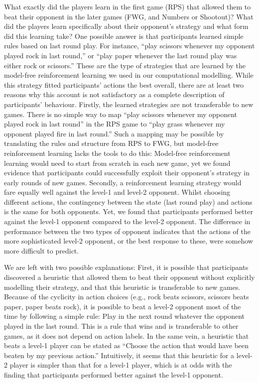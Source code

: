 \documentclass[smallextended]{svjour3}       %
\begin{document}
What exactly did the players learn in the first game (RPS) that allowed
them to beat their opponent in the later games (FWG, and Numbers or
Shootout)? What did the players learn specifically about their
opponent's strategy and what form did this learning take? One possible
answer is that participants learned simple rules based on last round
play. For instance, ``play scissors whenever my opponent played rock in
last round,'' or ``play paper whenever the last round play was either
rock or scissors.'' These are the type of strategies that are learned by
the model-free reinforcement learning we used in our computational
modelling. While this strategy fitted participants' actions the best
overall, there are at least two reasons why this account is not
satisfactory as a complete description of participants' behaviour.
Firstly, the learned strategies are not transferable to new games. There
is no simple way to map ``play scissors whenever my opponent played rock
in last round'' in the RPS game to ``play grass whenever my opponent
played fire in last round.'' Such a mapping may be possible by
translating the rules and structure from RPS to FWG, but model-free
reinforcement learning lacks the tools to do this: Model-free
reinforcement learning would need to start from scratch in each new
game, yet we found evidence that participants could successfully exploit
their opponent's strategy in early rounds of new games. Secondly, a
reinforcement learning strategy would fare equally well against the
level-1 and level-2 opponent. Whilst choosing different actions, the
contingency between the state (last round play) and actions is the same
for both opponents. Yet, we found that participants performed better
against the level-1 opponent compared to the level-2 opponent. The
difference in performance between the two types of opponent indicates
that the actions of the more sophisticated level-2 opponent, or the best
response to these, were somehow more difficult to predict.

We are left with two possible explanations: First, it is possible that
participants discovered a heuristic that allowed them to beat their
opponent without explicitly modelling their strategy, and that this
heuristic is transferable to new games. Because of the cyclicity in
action choices (e.g., rock beats scissors, scissors beats paper, paper
beats rock), it is possible to beat a level-2 opponent most of the time
by following a simple rule: Play in the next round whatever the opponent
played in the last round. This is a rule that wins and is transferable
to other games, as it does not depend on action labels. In the same
vein, a heuristic that beats a level-1 player can be stated as ``Choose
the action that would have been beaten by my previous action.''
Intuitively, it seems that this heuristic for a level-2 player is
simpler than that for a level-1 player, which is at odds with the
finding that participants performed better against the level-1 opponent.
\end{document}
